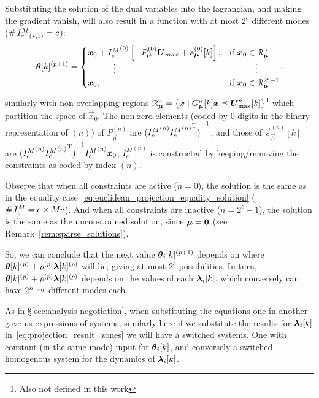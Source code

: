 \documentclass[../main.tex]{subfiles}
\begin{document}
Substituting the solution of the dual variables into the lagrangian, and making the gradient vanish, will also result in a \pwa{} function with at most $2^{c}$ different modes (${\card{\elem[*,1]{I_{c}^{M}}}=c}$):
\begin{equation}
  \label{eq:projection_result_zones}
  \begin{aligned}
    \vec{\theta}[k]\pplusone=
    \begin{cases}
      \vec{x}_{0}+
      {I_{c}^{M}}^{(0)}\left[-P_{\vec{\mu}}^{(0)}\vec{U}_{max}+\vec{s}_{\vec{\mu}}^{(0)}[k]\right],&\text{if}\ \vec{x}_{0}\in\set{R}_{\vec{\mu}}^{0}\\
      \qquad\quad \vdots&\qquad\quad \vdots\\
      \vec{x}_{0},&\text{if}\ \vec{x}_{0}\in\set{R}_{\vec{\mu}}^{2^{c}-1}\\
    \end{cases}
  \end{aligned},
\end{equation}
similarly with non-overlapping regions ${\set{R}_{\vec{\mu}}^{n}=\setbuild{\vec{x}}{G_{\vec{\mu}}^{n}[k]\vec{x} \preceq \vec{U}_{\max}^{n}[k]}}$\footnote{Also not defined in this work} which partition the space of $\vec{x}_{0}$.
The non-zero elements (coded by $0$ digits in the binary representation of $(n)$) of $P_{\vec{\mu}}^{(n)}$ are ${({I_{c}^{M}}^{(n)}{{I_{c}^{M}}^{(n)}}\T)}^{-1}$, and those of $\vec{s}_{\vec{\mu}}^{(n)}[k]$ are ${{({I_{c}^{M}}^{(n)}{{I_{c}^{M}}^{(n)}}\T)}^{-1}{I_{c}^{M}}^{(n)}\vec{x}_{0}}$, ${I_{c}^{M}}^{(n)}$ is constructed by keeping/removing the constraints as coded by index $(n)$.

Observe that when all constraints are active ($n=0$), the solution is the same as in the equality case~\eqref{eq:euclidean_projection_equality_solution} ($\card{I_{c}^{M}}=c\times Mc$).
And when all constraints are inactive ($n=2^{c}-1$), the solution is the same as the unconstrained solution, since $\vec{\mu}=\0$ (see Remark~\ref{rem:sparse_solutions}).

So, we can conclude that the next value $\thetaik\pplusone$ depends on where $\vec{\theta}[k]\p+\rho\p\vec{\lambda}[k]\p$ will lie, giving at most $2^{c}$ possibilities.
In turn, $\vec{\theta}[k]\p+\rho\p\vec{\lambda}[k]\p$ depends on the values of each $\lambdaik$, which conversely can have $2^{\nineq}$ different modes each.

As in \S\ref{sec:analysis-negotiation}, when substituting the equations one in another gave us expressions of \dt{} systems, similarly here if we substitute the results for $\lambdaik$ in~\eqref{eq:projection_result_zones} we will have a switched \dt{} systems.
One with constant (in the same mode) input for $\thetaik$, and conversely a switched homogenous system for the dynamics of $\lambdaik$.
\end{document}
